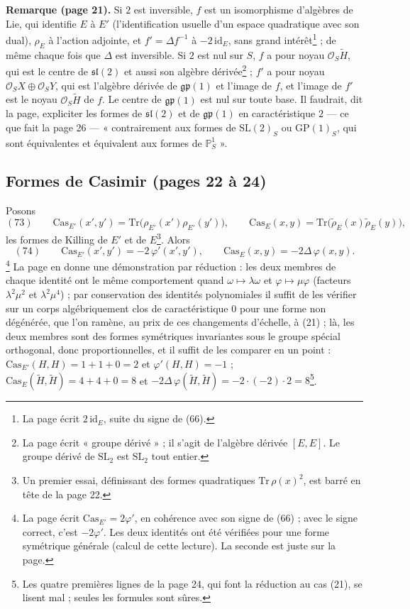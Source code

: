 \documentclass[11pt,a4paper]{article}
\begin{document}
\textbf{Remarque (page 21).} Si $2$ est inversible, $f$ est un isomorphisme
d'algèbres de Lie, qui identifie $E$ à $E'$ (l'identification usuelle d'un espace
quadratique avec son dual), $\rho_E$ à l'action adjointe, et $f' = \Delta f^{-1}$ à
$-2\,\mathrm{id}_E$, sans grand intérêt\footnote{La page écrit $2\,\mathrm{id}_E$,
suite du signe de (66).} ; de même chaque fois que $\Delta$ est inversible. Si $2$
est nul sur $S$, $f$ a pour noyau $\mathcal{O}_S\widetilde{H}$, qui est le centre de
$\mathfrak{sl}(2)$ et aussi son algèbre dérivée\footnote{La page écrit « groupe
dérivé » ; il s'agit de l'algèbre dérivée $[E, E]$. Le groupe dérivé de
$\mathrm{SL}_2$ est $\mathrm{SL}_2$ tout entier.} ; $f'$ a pour noyau
$\mathcal{O}_S X \oplus \mathcal{O}_S Y$, qui est l'algèbre dérivée de $\mathfrak{gp}(1)$ et
l'image de $f$, et l'image de $f'$ est le noyau $\mathcal{O}_S\widetilde{H}$ de $f$. Le
centre de $\mathfrak{gp}(1)$ est nul sur toute base. Il faudrait, dit la page,
expliciter les formes de $\mathfrak{sl}(2)$ et de $\mathfrak{gp}(1)$ en
caractéristique $2$ — ce que fait la page 26 — « contrairement aux formes de
$\mathrm{SL}(2)_S$ ou $\mathrm{GP}(1)_S$, qui sont équivalentes et équivalent aux formes
de $\mathbb{P}^1_S$ ».

\subsection*{Formes de Casimir (pages 22 à 24)}

Posons
\[
  (73) \qquad \mathrm{Cas}_{E'}(x', y') = \mathrm{Tr}\bigl(\rho_{E'}(x')\rho_{E'}(y')\bigr), \qquad
  \mathrm{Cas}_E(x, y) = \mathrm{Tr}\bigl(\tilde{\rho}_E(x)\tilde{\rho}_E(y)\bigr),
\]
les formes de Killing de $E'$ et de $E$\footnote{Un premier essai, définissant
des formes quadratiques $\mathrm{Tr}\,\rho(x)^2$, est barré en tête de la page 22.}.
Alors
\[
  (74) \qquad \mathrm{Cas}_{E'}(x', y') = -2\,\varphi'(x', y') , \qquad
  \mathrm{Cas}_E(x, y) = -2\Delta\, \varphi(x, y) .
\]
\footnote{La page écrit $\mathrm{Cas}_{E'} = 2\varphi'$, en cohérence avec son signe de
(66) ; avec le signe correct, c'est $-2\varphi'$. Les deux identités ont été
vérifiées pour une forme symétrique générale (calcul de cette lecture). La
seconde est juste sur la page.}
La page en donne une démonstration par réduction : les deux membres de chaque
identité ont le même comportement quand $\omega \mapsto \lambda\omega$ et
$\varphi \mapsto \mu\varphi$ (facteurs $\lambda^2\mu^2$ et $\lambda^2\mu^4$) ; par
conservation des identités polynomiales il suffit de les vérifier sur un corps
algébriquement clos de caractéristique $0$ pour une forme non dégénérée, que l'on
ramène, au prix de ces changements d'échelle, à (21) ; là, les deux membres sont
des formes symétriques invariantes sous le groupe spécial orthogonal, donc
proportionnelles, et il suffit de les comparer en un point :
$\mathrm{Cas}_{E'}(H, H) = 1 + 1 + 0 = 2$ et $\varphi'(H, H) = -1$ ;
$\mathrm{Cas}_E(\widetilde{H}, \widetilde{H}) = 4 + 4 + 0 = 8$ et
$-2\Delta\,\varphi(\widetilde{H}, \widetilde{H}) = -2 \cdot (-2) \cdot 2 = 8$\footnote{Les
quatre premières lignes de la page 24, qui font la réduction au cas (21), se
lisent mal ; seules les formules sont sûres.}.
\end{document}
